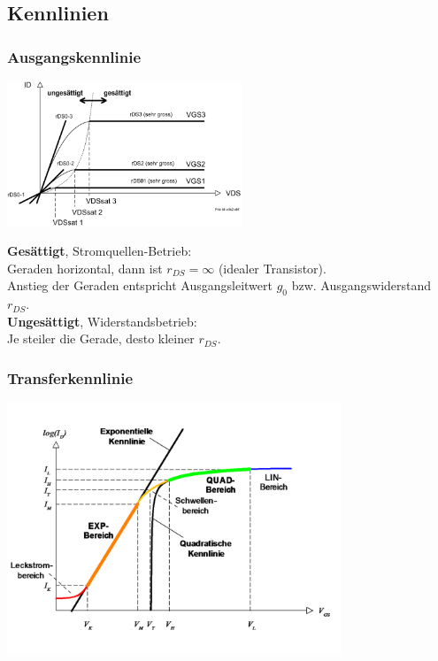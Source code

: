 \subsection{Kennlinien}
\subsubsection{Ausgangskennlinie}
\begin{minipage}{8cm}
	\centering
	\includegraphics[width=7cm]{images/Ausgangskennlinie.png}
\end{minipage}
\begin{minipage}{10cm}
	\textbf{Gesättigt}, Stromquellen-Betrieb:\\
	Geraden horizontal, dann ist $r_{DS}=\infty$ (idealer Transistor). \\
	Anstieg der Geraden entspricht Ausgangsleitwert $g_0$ bzw. Ausgangswiderstand $r_{DS}$. \\
	
	\textbf{Ungesättigt}, Widerstandsbetrieb: \\
	Je steiler die Gerade, desto kleiner $r_{DS}$. \\
\end{minipage}

\subsubsection{Transferkennlinie}
{	\centering
	\qquad\qquad
		\includegraphics[width=10cm]{images/Transferkennlinie.png}
} \\

